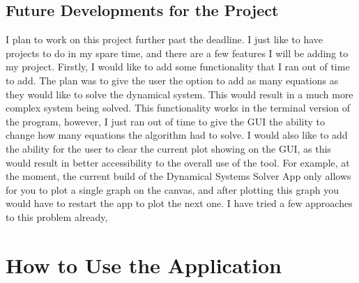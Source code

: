\documentclass[12pt]{report}
\begin{document}
\section{Future Developments for the Project}
I plan to work on this project further past the deadline. I just like to have projects to do in my spare time, and there are a few features I will be adding to my project. Firstly, I would like to add some functionality that I ran out of time to add. The plan was to give the user the option to add as many equations as they would like to solve the dynamical system. This would result in a much more complex system being solved. This functionality works in the terminal version of the program, however, I just ran out of time to give the GUI the ability to change how many equations the algorithm had to solve. I would also like to add the ability for the user to clear the current plot showing on the GUI, as this would result in better accessibility to the overall use of the tool. For example, at the moment, the current build of the Dynamical Systems Solver App only allows for you to plot a single graph on the canvas, and after plotting this graph you would have to restart the app to plot the next one. I have tried a few approaches to this problem already,
\chapter{How to Use the Application}
\end{document}
